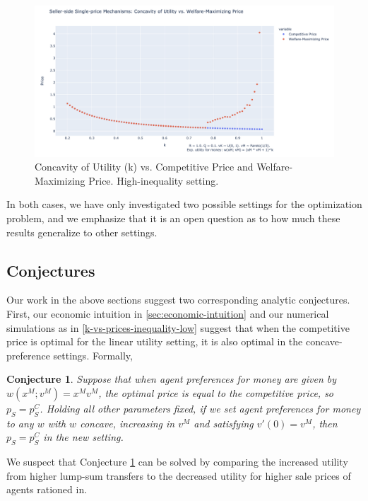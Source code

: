 \documentclass[AER]{AEA}
\newtheorem{conj}[theorem]{Conjecture}
\begin{document}
\begin{figure}
    \label{k-vs-prices-inequality-high}
    \includegraphics[width=\textwidth]{figures/k-vs-prices-inequality-high.png}
    \caption{Concavity of Utility (k) vs. Competitive Price and Welfare-Maximizing Price. High-inequality setting.}
\end{figure}

In both cases, we have only investigated two possible settings for the optimization problem, and we emphasize that it is an open question as to how much these results generalize to other settings.

\subsection{Conjectures}

Our work in the above sections suggest two corresponding analytic conjectures. First, our economic intuition in \ref{sec:economic-intuition} and our numerical simulations as in \ref{k-vs-prices-inequality-low} suggest that when the competitive price is optimal for the linear utility setting, it is also optimal in the concave-preference settings. Formally,

\begin{conj}
    \label{conj:competitive-price}
    Suppose that when agent preferences for money are given by $w(x^M; v^M) = x^M v^M$, the optimal price is equal to the competitive price, so $p_S = p_S^C$. Holding all other parameters fixed, if we set agent preferences for money to any $w$ with $w$ concave, increasing in $v^M$ and satisfying $v'(0) = v^M$, then $p_S = p_S^C$ in the new setting.
\end{conj}

We suspect that Conjecture \ref{conj:competitive-price} can be solved by comparing the increased utility from higher lump-sum transfers to the decreased utility for higher sale prices of agents rationed in.
\end{document}
